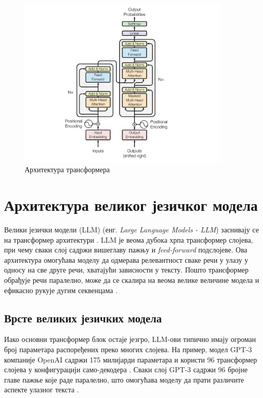 \begin{figure}[h]
    \centering
    \includegraphics[width=0.9\textwidth]{images/transformer.png}
    \caption{Архитектура трансформера}
    \label{fig:transformer}
\end{figure}

\section{Архитектура великог језичког модела}
\label{sec:llm_architecture}

Велики језички модели (LLM) (енг. \textit{Large Language Models - LLM}) заснивају се на трансформер архитектури \cite{vaswani_attention_2017}. LLM је веома дубока хрпа трансформер слојева, при чему сваки слој садржи вишеглаву пажњу и \textit{feed-forward} подслојеве. Ова архитектура омогућава моделу да одмерава релевантност сваке речи у улазу у односу на све друге речи, хватајући зависности у тексту. Пошто трансформер обрађује речи паралелно, може да се скалира на веома велике величине модела и ефикасно рукује дугим секвенцама \cite{vaswani_attention_2017}.

\subsection{Врсте великих језичких модела}

Иако основни трансформер блок остаје језгро, LLM-ови типично имају огроман број параметара распоређених преко многих слојева. На пример, модел GPT-3 компаније OpenAI садржи 175 милијарди параметара и користи 96 трансформер слојева у конфигурацији само-декодера \cite{brown_language_2020}. Сваки слој GPT-3 садржи 96 бројне главе пажње које раде паралелно, што омогућава моделу да прати различите аспекте улазног текста \cite{brown_language_2020}.

